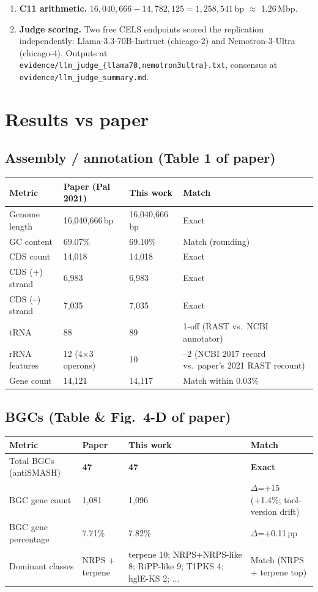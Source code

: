 \documentclass[11pt,letterpaper]{article}
\begin{document}
\begin{enumerate}
\item \textbf{C11 arithmetic.} $16{,}040{,}666 - 14{,}782{,}125 = 1{,}258{,}541$\,bp $\approx$ 1.26\,Mbp.
\item \textbf{Judge scoring.} Two free CELS endpoints scored the replication independently: Llama-3.3-70B-Instruct (chicago-2) and Nemotron-3-Ultra (chicago-4). Outputs at \texttt{evidence/llm\_judge\_\{llama70,nemotron3ultra\}.txt}, consensus at \texttt{evidence/llm\_judge\_summary.md}.
\end{enumerate}

\section{Results vs paper}

\subsection{Assembly / annotation (Table 1 of paper)}

\begin{longtable}{@{}p{4cm}p{3cm}p{3cm}p{3cm}@{}}
\toprule
Metric & Paper (Pal 2021) & This work & Match \\
\midrule
Genome length & 16{,}040{,}666\,bp & 16{,}040{,}666\,bp & Exact \\
GC content & 69.07\% & 69.10\% & Match (rounding) \\
CDS count & 14{,}018 & 14{,}018 & Exact \\
CDS (+) strand & 6{,}983 & 6{,}983 & Exact \\
CDS (--) strand & 7{,}035 & 7{,}035 & Exact \\
tRNA & 88 & 89 & 1-off (RAST vs.\ NCBI annotator) \\
rRNA features & 12 (4$\times$3 operons) & 10 & --2 (NCBI 2017 record vs.\ paper's 2021 RAST recount) \\
Gene count & 14{,}121 & 14{,}117 & Match within 0.03\% \\
\bottomrule
\end{longtable}

\subsection{BGCs (Table \& Fig.\ 4-D of paper)}

\begin{longtable}{@{}p{4cm}p{2.5cm}p{3.5cm}p{3cm}@{}}
\toprule
Metric & Paper & This work & Match \\
\midrule
Total BGCs (antiSMASH) & \textbf{47} & \textbf{47} & \textbf{Exact} \\
BGC gene count & 1{,}081 & 1{,}096 & $\Delta$=+15 (+1.4\%; tool-version drift) \\
BGC gene percentage & 7.71\% & 7.82\% & $\Delta$=+0.11\,pp \\
Dominant classes & NRPS + terpene & terpene 10; NRPS+NRPS-like 8; RiPP-like 9; T1PKS 4; hglE-KS 2; $\ldots$ & Match (NRPS + terpene top) \\
\bottomrule
\end{longtable}
\end{document}
